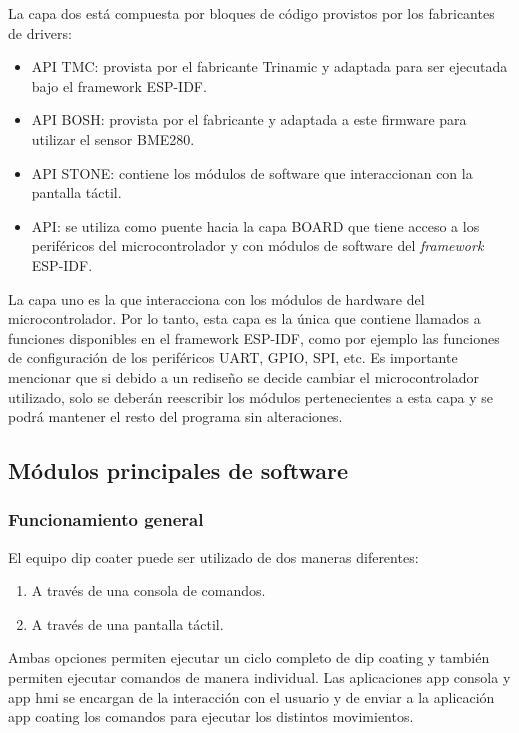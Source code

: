 La capa dos está compuesta por bloques de código provistos por los fabricantes de drivers:
\begin{itemize}
\item API TMC: provista por el fabricante Trinamic y adaptada para ser ejecutada bajo el framework ESP-IDF.
\item API BOSH: provista por el fabricante y adaptada a este firmware para utilizar el sensor BME280.
\item API STONE: contiene los módulos de software que interaccionan con la pantalla táctil.
\item API: se utiliza como puente hacia la capa BOARD que tiene acceso a los periféricos del microcontrolador y con módulos de software del \textit{framework} ESP-IDF.

\end{itemize}

La capa uno es la que interacciona con los módulos de hardware del microcontrolador. Por lo tanto, esta capa es la única que contiene llamados a funciones disponibles en el framework ESP-IDF, como por ejemplo las funciones de configuración de los periféricos UART, GPIO, SPI, etc. Es importante mencionar que si debido a un rediseño se decide cambiar el microcontrolador utilizado, solo se deberán reescribir los módulos pertenecientes a esta capa y se podrá mantener el resto del programa sin alteraciones.

\subsection{Módulos principales de software}
\label{sec:modulos principales}

\subsubsection{Funcionamiento general}
 

El equipo dip coater puede ser utilizado de dos maneras diferentes:

\begin{enumerate}
\item A través de una consola de comandos.
\item A través de una pantalla táctil.
\end{enumerate}

Ambas opciones permiten ejecutar un ciclo completo de dip coating y también permiten ejecutar comandos de manera individual. Las aplicaciones app consola y app hmi se encargan de la interacción con el usuario y de enviar a la aplicación app coating los comandos para ejecutar los distintos movimientos.

